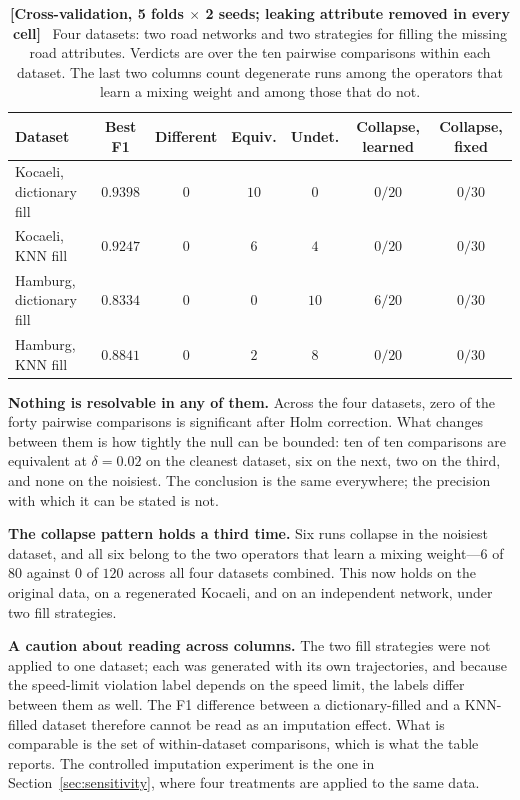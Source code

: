 \documentclass[journal]{IEEEtran}
\begin{document}
\begin{table}[!t]
  \centering
  \caption{\textbf{[Cross-validation, 5 folds $\times$ 2 seeds; leaking
  attribute removed in every cell]}~ Four datasets: two road networks and two
  strategies for filling the missing road attributes. Verdicts are over the
  ten pairwise comparisons within each dataset. The last two columns count
  degenerate runs among the operators that learn a mixing weight and among
  those that do not.}
  \label{tab:four_datasets}
  \renewcommand{\arraystretch}{1.2}
  \footnotesize
  \begin{tabular}{@{}lcccccc@{}}
    \toprule
    \textbf{Dataset} & \textbf{Best F1} & \textbf{Different} & \textbf{Equiv.}
    & \textbf{Undet.} & \textbf{Collapse, learned} & \textbf{Collapse, fixed} \\ \midrule
    Kocaeli, dictionary fill & $0.9398$ & $0$ & $10$ & $0$ & $0/20$ & $0/30$ \\
    Kocaeli, KNN fill & $0.9247$ & $0$ & $6$ & $4$ & $0/20$ & $0/30$ \\
    Hamburg, dictionary fill & $0.8334$ & $0$ & $0$ & $10$ & $6/20$ & $0/30$ \\
    Hamburg, KNN fill & $0.8841$ & $0$ & $2$ & $8$ & $0/20$ & $0/30$ \\
    \bottomrule
  \end{tabular}
\end{table}

\textbf{Nothing is resolvable in any of them.} Across the four datasets, zero
of the forty pairwise comparisons is significant after Holm correction. What
changes between them is how tightly the null can be bounded: ten of ten
comparisons are equivalent at $\delta = 0.02$ on the cleanest dataset, six on
the next, two on the third, and none on the noisiest. The conclusion is the
same everywhere; the precision with which it can be stated is not.

\textbf{The collapse pattern holds a third time.} Six runs collapse in the
noisiest dataset, and all six belong to the two operators that learn a mixing
weight---$6$ of $80$ against $0$ of $120$ across all four
datasets combined. This now holds on the original data, on a regenerated
Kocaeli, and on an independent network, under two fill strategies.

\textbf{A caution about reading across columns.} The two fill strategies were
not applied to one dataset; each was generated with its own trajectories, and
because the speed-limit violation label depends on the speed limit, the labels
differ between them as well. The F1 difference between a dictionary-filled and
a KNN-filled dataset therefore cannot be read as an imputation effect. What is
comparable is the set of within-dataset comparisons, which is what the table
reports. The controlled imputation experiment is the one in
Section~\ref{sec:sensitivity}, where four treatments are applied to the same
data.
\end{document}
